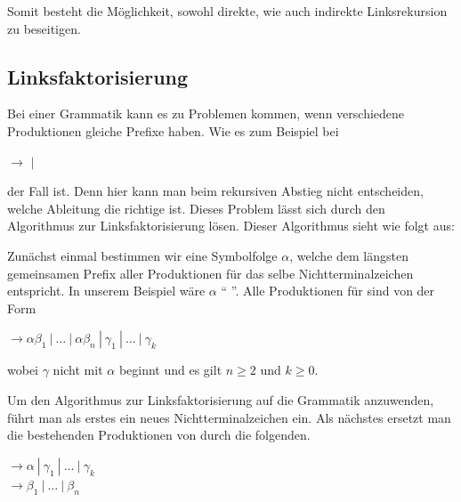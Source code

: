 Somit besteht die Möglichkeit, sowohl direkte, wie auch indirekte Linksrekursion
zu beseitigen.\vspace{10pt}


\subsection{Linksfaktorisierung}\label{PerspectiveLeftfactorisation}

Bei einer Grammatik kann es zu Problemen kommen, wenn verschiedene Produktionen
gleiche Prefixe haben. Wie es zum Beispiel bei \vspace{10pt}

\noindent
{}$ \to$   
   $|$ 
   
\vspace{10pt}

\noindent der Fall ist. Denn hier kann man beim rekursiven Abstieg nicht
entscheiden, welche Ableitung die richtige ist. Dieses Problem lässt sich durch
den Algorithmus zur Linksfaktorisierung lösen. Dieser Algorithmus sieht wie folgt
aus:\vspace{10pt}

Zunächst einmal bestimmen wir eine Symbolfolge $\alpha$, welche dem längsten
gemeinsamen Prefix aller Produktionen für das selbe Nichtterminalzeichen
 entspricht. In unserem Beispiel wäre $\alpha$ 
"`  
"'. Alle Produktionen für  sind von der
Form\vspace{10pt}

\noindent
{}$ \to \alpha \beta_1\ |\ \ldots\ |\ \alpha
\beta_n\ |\ \gamma_1\ |\ \ldots\ |\ \gamma_k$
\vspace{10pt}

\noindent
wobei $\gamma$ nicht mit $\alpha$ beginnt und es gilt $n \geq 2$ und $k \geq 0$.
\vspace{10pt}

Um den Algorithmus zur Linksfaktorisierung auf die Grammatik anzuwenden, führt
man als erstes ein neues Nichtterminalzeichen  ein. Als
nächstes ersetzt man die bestehenden Produktionen von 
durch die folgenden.\vspace{10pt}

\noindent
{}$ \to \alpha $$\ |\ \gamma_1\ |\
\ldots\ |\ \gamma_k$\\ $ \to \beta_1\ |\ \ldots\ |\ \beta_n$
\vspace{10pt}


